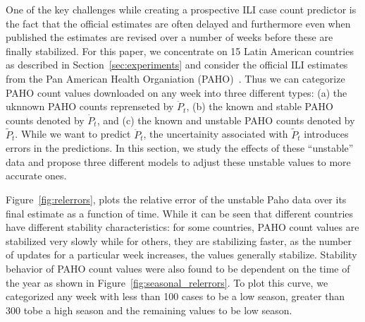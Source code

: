 
One of the key challenges while creating a prospective ILI case count
predictor is the fact that the official estimates are often 
delayed and furthermore even when published the estimates are revised
over a number of weeks before these are finally stabilized.
For this paper, we concentrate on 15 Latin American countries 
as described in Section~\ref{sec:experiments} and consider the official 
ILI estimates from the Pan American Health Organiation (PAHO)~\cite{PAHO:2013}.
Thus we can categorize PAHO count values downloaded on any week
into three different types: (a) the uknnown
PAHO counts reprenseted  by $\ddot{P}_t$, (b) the known and stable PAHO counts
denoted by $\dot{P}_t$, and (c) the known and unstable PAHO counts denoted by
$\tilde{P}_t$. While we want to predict $\ddot{P}_t$, the uncertainity associated
with $\tilde{P}_t$ introduces errors in the predictions. In this section, 
we study the effects of these ``unstable'' data and propose 
three different models to adjust these unstable
values to more accurate ones.


Figure~\ref{fig:relerrors}, plots the relative error of the unstable Paho data over
its final estimate as a function of time. While it can be seen that different countries 
have different stability characteristics: 
for some countries, PAHO count values are
stabilized very slowly while for others, they are stabilizing faster, as the number of 
updates for a particular week increases, the values generally stabilize.
Stability behavior of PAHO count values were also found to be dependent on the 
time of the year as shown in Figure~\ref{fig:seasonal_relerrors}.
To plot this curve, we categorized any week with less than 100 cases to be a low season,
greater than 300 tobe a high season and the remaining values to be low season.

